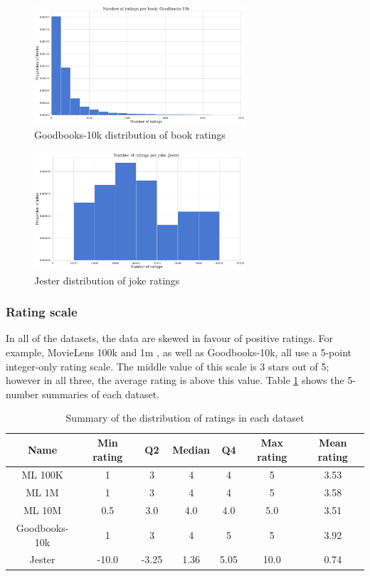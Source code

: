 \begin{figure}[H]
\centering
\includegraphics[width=0.7\textwidth]{Figures/3_ratings-distributions/goodbooks-ratings.pdf}
\caption{Goodbooks-10k distribution of book ratings}
\label{fig:goodbooks-items}
\end{figure}

\begin{figure}[H]
\centering
\includegraphics[width=0.7\textwidth]{Figures/3_ratings-distributions/jester_joke-ratings.pdf}
\caption{Jester distribution of joke ratings}
\label{fig:jester-items}
\end{figure}

\subsubsection{Rating scale}
In all of the datasets, the data are skewed in favour of positive ratings. For example, MovieLens 100k and 1m , as well as Goodbooks-10k, all use a 5-point integer-only rating scale. The middle value of this scale is 3 stars out of 5; however in all three, the average rating is above this value. Table \ref{tab:ratings-5-number-summaries} shows the 5-number summaries of each dataset.

\begin{table}[H]
\label{tab:ratings-5-number-summaries}
\centering
\begin{tabular}{c | c | c | c | c | c | c}
\toprule
\textbf{Name} & \textbf{Min rating} & \textbf{Q2} & \textbf{Median} & \textbf{Q4} & \textbf{Max rating} & \textbf{Mean rating} \\
\midrule
ML 100K & 1 & 3 & 4 & 4 & 5 & 3.53 \\
ML 1M & 1 & 3 & 4 & 4 & 5 & 3.58 \\
ML 10M & 0.5 & 3.0 & 4.0 & 4.0 & 5.0 & 3.51 \\
Goodbooks-10k & 1 & 3 & 4 & 5 & 5 & 3.92 \\
Jester & -10.0 & -3.25 & 1.36 & 5.05 & 10.0 & 0.74 \\
\bottomrule
\end{tabular}
\caption[5-number of summaries of ratings]{Summary of the distribution of ratings in each dataset}
\end{table}

